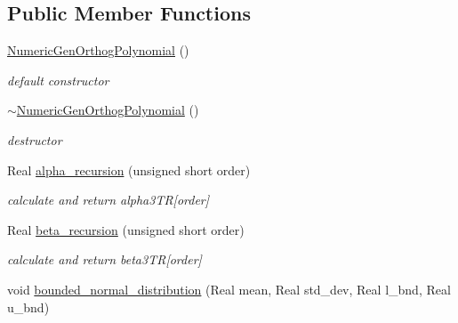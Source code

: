 \subsection*{Public Member Functions}
\begin{DoxyCompactItemize}
\item 
\hyperlink{classPecos_1_1NumericGenOrthogPolynomial_aed4a0fd6a1af04dc56a264c5678a2fac}{Numeric\+Gen\+Orthog\+Polynomial} ()\label{classPecos_1_1NumericGenOrthogPolynomial_aed4a0fd6a1af04dc56a264c5678a2fac}

\begin{DoxyCompactList}\small\item\em default constructor \end{DoxyCompactList}\item 
\hyperlink{classPecos_1_1NumericGenOrthogPolynomial_aa0cdaf73221c07cee322ba48adc4dea5}{$\sim$\+Numeric\+Gen\+Orthog\+Polynomial} ()\label{classPecos_1_1NumericGenOrthogPolynomial_aa0cdaf73221c07cee322ba48adc4dea5}

\begin{DoxyCompactList}\small\item\em destructor \end{DoxyCompactList}\item 
Real \hyperlink{classPecos_1_1NumericGenOrthogPolynomial_a7ad109946452e70e95aa68ffefd2c37f}{alpha\+\_\+recursion} (unsigned short order)\label{classPecos_1_1NumericGenOrthogPolynomial_a7ad109946452e70e95aa68ffefd2c37f}

\begin{DoxyCompactList}\small\item\em calculate and return alpha3\+TR\mbox{[}order\mbox{]} \end{DoxyCompactList}\item 
Real \hyperlink{classPecos_1_1NumericGenOrthogPolynomial_aa4e36e6a9911ff7214ebc87e505702f5}{beta\+\_\+recursion} (unsigned short order)\label{classPecos_1_1NumericGenOrthogPolynomial_aa4e36e6a9911ff7214ebc87e505702f5}

\begin{DoxyCompactList}\small\item\em calculate and return beta3\+TR\mbox{[}order\mbox{]} \end{DoxyCompactList}\item 
void \hyperlink{classPecos_1_1NumericGenOrthogPolynomial_ae391dd223bd9a29d15f7d75e7305b7b7}{bounded\+\_\+normal\+\_\+distribution} (Real mean, Real std\+\_\+dev, Real l\+\_\+bnd, Real u\+\_\+bnd)\label{classPecos_1_1NumericGenOrthogPolynomial_ae391dd223bd9a29d15f7d75e7305b7b7}


\end{DoxyCompactItemize}
